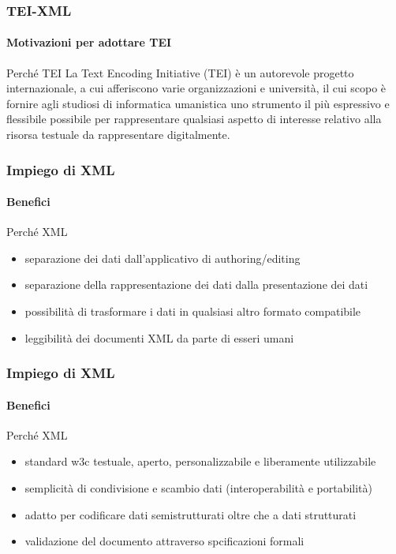 \begin{frame}
	\frametitle{TEI-XML}
	\framesubtitle{Motivazioni per adottare TEI}
	\addtocounter{nframe}{1}

	\begin{block}{Perché TEI}
		La Text Encoding Initiative (TEI) è un autorevole progetto internazionale, a cui afferiscono varie organizzazioni e università, il cui scopo è fornire agli studiosi di informatica umanistica uno strumento il più espressivo e flessibile possibile per rappresentare qualsiasi aspetto di interesse relativo alla risorsa testuale da rappresentare digitalmente.
	\end{block}

\end{frame}

\begin{frame}
	\frametitle{Impiego di XML}
	\framesubtitle{Benefici}
	\addtocounter{nframe}{1}

	\begin{block}{Perché XML}
		\begin{itemize}
			\item separazione dei dati dall'applicativo di authoring/editing 
			\item separazione della rappresentazione dei dati dalla presentazione dei dati
			\item possibilità di trasformare i dati in qualsiasi altro formato compatibile
			\item leggibilità dei documenti XML da parte di esseri umani
		\end{itemize}

	\end{block}
	

\end{frame}

\begin{frame}
	\frametitle{Impiego di XML}
	\framesubtitle{Benefici}
	\addtocounter{nframe}{1}

	\begin{block}{Perché XML}
		\begin{itemize}
			\item standard w3c testuale, aperto, personalizzabile e liberamente utilizzabile
			\item semplicità di condivisione e scambio dati (interoperabilità e portabilità)
			\item adatto per codificare dati semistrutturati oltre che a dati strutturati
			\item validazione del documento attraverso spcificazioni formali
		\end{itemize}

	\end{block}
	

\end{frame}



